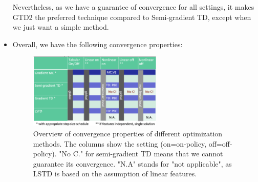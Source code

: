 \begin{itemize}
	Nevertheless, as we have a guarantee of convergence for all settings, it makes GTD2 the preferred technique compared to Semi-gradient TD, except when we just want a simple method.
	\item Overall, we have the following convergence properties:
	\begin{figure}[ht!]
		\centering
		\includegraphics[width=0.6\textwidth]{figures/rl_approximate_value_based_convergence_overview.png}
		\caption{Overview of convergence properties of different optimization methods. The columns show the setting (on=on-policy, off=off-policy). "No C." for semi-gradient TD means that we cannot guarantee its convergence. "N.A" stands for "not applicable", as LSTD is based on the assumption of linear features.}
	\end{figure}	
\end{itemize}
